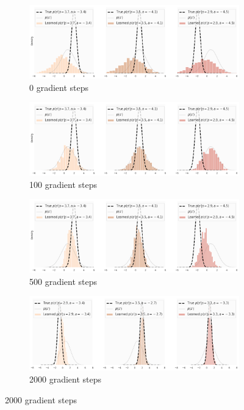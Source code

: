 \begin{figure}
\centering
\captionsetup{size=footnotesize}
\begin{subfigure}{\linewidth}
  \centering
  \includegraphics[width=0.9\linewidth]{img/trivariate/trivariate_step0}
  \caption{0 gradient steps}
\end{subfigure}
\begin{subfigure}{\textwidth}
  \centering
  \includegraphics[width=0.9\linewidth]{img/trivariate/trivariate_step100}
  \caption{100 gradient steps}
\end{subfigure}
\begin{subfigure}{\textwidth}
  \centering
  \includegraphics[width=0.9\linewidth]{img/trivariate/trivariate_step500}
  \caption{500 gradient steps}
\end{subfigure}
\begin{subfigure}{\textwidth}
  \centering
  \includegraphics[width=0.9\linewidth]{img/trivariate/trivariate_step2000}
  \caption{2000 gradient steps}
\end{subfigure}


\end{figure}
